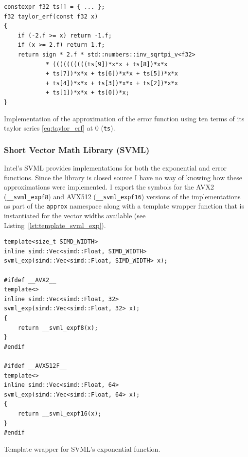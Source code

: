 \documentclass[a4paper, 11pt]{memoir}
\begin{document}
    \begin{listing}[H]
        \begin{verbatim}
constexpr f32 ts[] = { ... };
f32 taylor_erf(const f32 x)
{
    if (-2.f >= x) return -1.f;
    if (x >= 2.f) return 1.f;
    return sign * 2.f * std::numbers::inv_sqrtpi_v<f32>
            * ((((((((((ts[9])*x*x + ts[8])*x*x
            + ts[7])*x*x + ts[6])*x*x + ts[5])*x*x
            + ts[4])*x*x + ts[3])*x*x + ts[2])*x*x
            + ts[1])*x*x + ts[0])*x;
}
        \end{verbatim}
        \caption{Implementation of the approximation of the error function using ten terms of its taylor series \eqref{eq:taylor_erf} at $0$ (\texttt{ts}).}
        \label{lst:horner_taylor}
    \end{listing}

    \subsubsection{Short Vector Math Library (SVML)}
    \label{sec:svml}
    Intel's SVML provides implementations for both the exponential and error functions. Since the library is closed
    source I have no way of knowing how these approximations were implemented. I export the symbols for the AVX2
    (\texttt{__svml_expf8}) and AVX512 (\texttt{__svml_expf16}) versions of the implementations as part of
    the \texttt{approx} namespace along with a template wrapper function that is instantiated for the vector
    widths available (see Listing~\ref{lst:template_svml_exp}).

    \begin{listing}[H]
        \begin{verbatim}
template<size_t SIMD_WIDTH>
inline simd::Vec<simd::Float, SIMD_WIDTH>
svml_exp(simd::Vec<simd::Float, SIMD_WIDTH> x);

#ifdef __AVX2__
template<>
inline simd::Vec<simd::Float, 32>
svml_exp(simd::Vec<simd::Float, 32> x);
{
    return __svml_expf8(x);
}
#endif

#ifdef __AVX512F__
template<>
inline simd::Vec<simd::Float, 64>
svml_exp(simd::Vec<simd::Float, 64> x);
{
    return __svml_expf16(x);
}
#endif
        \end{verbatim}
        \caption{Template wrapper for SVML's exponential function.}
        \label{lst:template_svml_exp}
    \end{listing}
\end{document}
